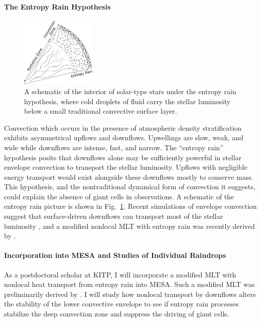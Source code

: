 \documentclass[preprint, hmargin=1in, vmargin=1in]{aastex62}
\begin{document}
\paragraph{The Entropy Rain Hypothesis}
\begin{figure}
	\begin{center}
	\vspace{-28pt}
    \includegraphics[width=0.32\textwidth]{./figs/entropy_rain_schematic.png}
	\vspace{-16pt}
	\end{center}
    \caption{
	A schematic of the interior of solar-type stars under the entropy rain hypothesis, where cold droplets of fluid carry the stellar luminosity below a small traditional convective surface layer.
	\label{fig:entropy_rain} }
	\vspace{-16pt}
\end{figure}

Convection which occurs in the presence of atmospheric density stratification exhibits asymmetrical upflows and downflows.
Upwellings are slow, weak, and wide while downflows are intense, fast, and narrow.
The ``entropy rain'' hypothesis \citep[][]{spruit1997} posits that downflows alone may be sufficiently powerful in stellar envelope convection to transport the stellar luminosity.
Upflows with negligible energy transport would exist alongside these downflows mostly to conserve mass.
This hypothesis, and the nontraditional dynamical form of convection it suggests, could explain the absence of giant cells in observations.
A schematic of the entropy rain picture is shown in Fig.~\ref{fig:entropy_rain}.
Recent simulations of envelope convection suggest that surface-driven downflows can transport most of the stellar luminosity \citep{kapyla&all2017}, and a modified nonlocal MLT with entropy rain was recently derived by \citet{brandenburg2016}.


\paragraph{Incorporation into MESA and Studies of Individual Raindrops} 
As a postdoctoral scholar at KITP, I will incorporate a modified MLT with nonlocal heat transport from entropy rain into MESA.
Such a modified MLT was preliminarily derived by \citet{brandenburg2016}.
I will study how nonlocal transport by downflows alters the stability of the lower convective envelope to see if entropy rain processes stabilize the deep convection zone and suppress the driving of giant cells.
\end{document}
